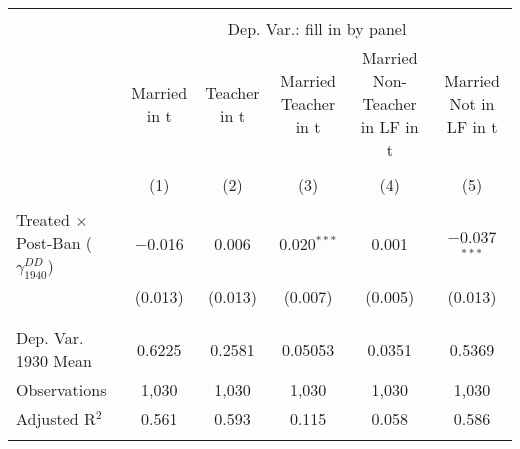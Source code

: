 
\begin{tabular}{@{\extracolsep{5pt}}lccccc} 
\\[-1.8ex]\hline 
\hline \\[-1.8ex] 
 & \multicolumn{5}{c}{Dep. Var.: fill in by panel} \\ 
\cline{2-6} 
 & Married in t & Teacher in t & Married Teacher in t & Married Non-Teacher in LF in t & Married Not in LF in t \\ 
\\[-1.8ex] & (1) & (2) & (3) & (4) & (5)\\ 
\hline \\[-1.8ex] 
 Treated $\times$ Post-Ban ($\gamma_{1940}^{DD}$) & $-$0.016 & 0.006 & 0.020$^{***}$ & 0.001 & $-$0.037$^{***}$ \\ 
  & (0.013) & (0.013) & (0.007) & (0.005) & (0.013) \\ 
  & & & & & \\ 
\hline \\[-1.8ex] 
Dep. Var. 1930 Mean & 0.6225 & 0.2581 & 0.05053 & 0.0351 & 0.5369 \\ 
Observations & 1,030 & 1,030 & 1,030 & 1,030 & 1,030 \\ 
Adjusted R$^{2}$ & 0.561 & 0.593 & 0.115 & 0.058 & 0.586 \\ 
\hline 
\hline \\[-1.8ex] 
\end{tabular} 
